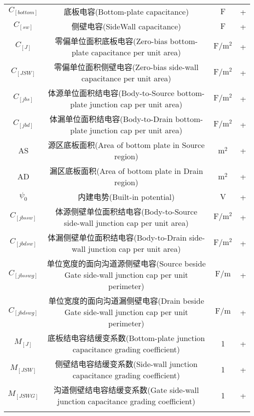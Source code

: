 \begin{table}[!htb]
{\begin{NiceTabular}{cccc}
        $C_[bottom]$ & 底板电容(Bottom-plate capacitance) & $\unit{\farad}$ & + \\
        $C_[sw]$ & 侧壁电容(SideWall capacitance) & $\unit{\farad}$ & + \\
        $C_[J]$ & 零偏单位面积底板电容(Zero-bias bottom-plate capacitance per unit area) & $\unit{\farad \per \meter \squared}$ & + \\
        $C_[JSW]$ & 零偏单位面积侧壁电容(Zero-bias side-wall capacitance per unit area) & $\unit{\farad \per \meter \squared}$ & + \\
        $C_[jbs]$ & 体源单位面积结电容(Body-to-Source bottom-plate junction cap per unit area) & $\unit{\farad \per \meter \squared}$ & + \\
        $C_[jbd]$ & 体漏单位面积结电容(Body-to-Drain bottom-plate junction cap per unit area) & $\unit{\farad \per \meter \squared}$ & + \\
        AS & 源区底板面积(Area of bottom plate in Source region) & $\unit{\meter \squared}$ & + \\
        AD & 漏区底板面积(Area of bottom plate in Drain region) & $\unit{\meter \squared}$ & + \\
        $\psi_0$ & 内建电势(Built-in potential) & $\unit{\volt}$ & + \\
        $C_[jbssw]$ & 体源侧壁单位面积结电容(Body-to-Source side-wall junction cap per unit area) & $\unit{\farad \per \meter \squared}$ & + \\
        $C_[jbdsw]$ & 体漏侧壁单位面积结电容(Body-to-Drain side-wall junction cap per unit area) & $\unit{\farad \per \meter \squared}$ & + \\
        $C_[jbsswg]$ & 单位宽度的面向沟道源侧壁电容(Source beside Gate side-wall junction cap per unit perimeter) & $\unit{\farad \per \meter}$ & + \\
        $C_[jbdswg]$ & 单位宽度的面向沟道漏侧壁电容(Drain beside Gate side-wall junction cap per unit perimeter) & $\unit{\farad \per \meter}$ & + \\
        $M_[J]$ & 底板结电容结缓变系数(Bottom-plate junction capacitance grading coefficient) & 1 & + \\
        $M_[JSW]$ & 侧壁结电容结缓变系数(Side-wall junction capacitance grading coefficient) & 1 & + \\
        $M_[JSWG]$ & 沟道侧壁结电容结缓变系数(Gate side-wall junction capacitance grading coefficient) & 1 & + \\
        \Xhline{1pt}
    \end{NiceTabular}
    }
\end{table}


